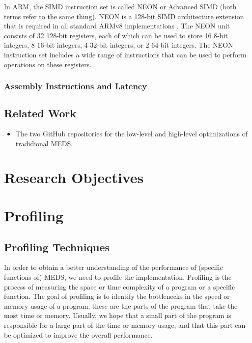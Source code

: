 \documentclass[11pt,a4paper]{report}
\theoremstyle{definition}
\begin{document}
In ARM, the SIMD instruction set is called NEON or Advanced SIMD (both terms refer to the same thing). NEON is a 128-bit SIMD architecture extension that is required in all standard ARMv8 implementations \cite{ARMv8A-ProgrammersGuide}. The NEON unit consists of 32 128-bit registers, each of which can be used to store 16 8-bit integers, 8 16-bit integers, 4 32-bit integers, or 2 64-bit integers. The NEON instruction set includes a wide range of instructions that can be used to perform operations on these registers.

\subsection{Assembly Instructions and Latency}

\section{Related Work}
\begin{itemize}
  \item The two GitHub repositories for the low-level and high-level optimizations of tradidional MEDS.
\end{itemize}

\chapter{Research Objectives}
\label{ch:researchobjectives}

\chapter{Profiling}
\label{ch:profiling}
\section{Profiling Techniques}
In order to obtain a better understanding of the performance of (specific functions of) MEDS, we need to profile the implementation. Profiling is the process of measuring the space or time complexity of a program or a specific function. The goal of profiling is to identify the bottlenecks in the speed or memory usage of a program, these are the parts of the program that take the most time or memory. Usually, we hope that a small part of the program is responsible for a large part of the time or memory usage, and that this part can be optimized to improve the overall performance.
\end{document}
